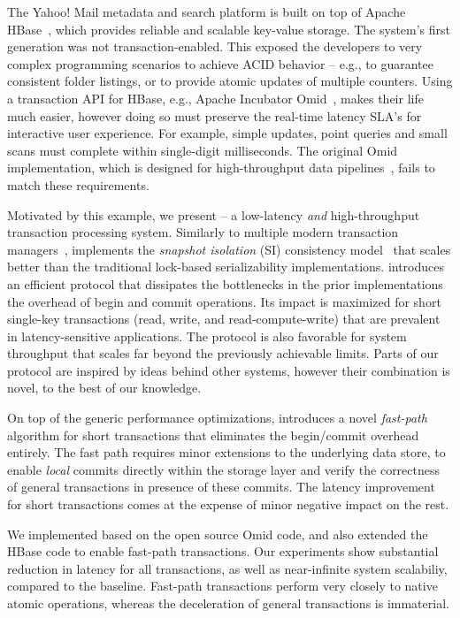 The Yahoo! Mail metadata and search platform is built on top of Apache HBase~\cite{hbase}, 
which provides reliable and scalable key-value storage. The system's first generation was not 
transaction-enabled. This exposed the developers to very complex programming scenarios 
to achieve ACID behavior -- e.g., to guarantee consistent folder listings, or to provide 
atomic updates of multiple counters. Using a transaction API for HBase, e.g.,  
Apache Incubator Omid~\cite{omid}, makes their life much easier, however doing so 
must preserve the real-time latency SLA's for interactive user experience. For example, 
simple updates, point queries and small scans must complete within single-digit milliseconds. 
The original Omid implementation, which is designed for high-throughput data pipelines~\cite{Omid2017}, 
fails to match these requirements. %

Motivated by this example, we present {\sys\/} -- a low-latency {\em and\/} high-throughput 
transaction processing system. Similarly to multiple modern transaction managers~\cite{cockroach,Spanner2012,Percolator2010,Omid2017},
{\sys\/} implements the {\em snapshot isolation} (SI) consistency model~\cite{DBLP:conf/sigmod/BerensonBGMOO95}
that scales better than the traditional lock-based serializability implementations. {\sys\/} introduces an efficient protocol 
that dissipates the bottlenecks in the prior implementations the overhead of begin and commit operations. 
Its impact is maximized for short single-key transactions (read, write, and read-compute-write) that are prevalent 
in latency-sensitive applications. The protocol is also favorable for system throughput that scales far beyond 
the previously achievable limits. Parts of our protocol are inspired by ideas behind other systems, however
their combination is novel, to the best of our knowledge. 

On top of the generic performance optimizations, {\sys\/} introduces a novel {\em fast-path\/} algorithm for short transactions 
that eliminates the begin/commit overhead entirely. The fast path requires minor extensions to the underlying 
data store, to enable {\em local\/} commits directly within the storage layer and verify the correctness of general 
transactions in presence of these commits. The latency improvement for short transactions comes at the expense 
of minor negative impact on the rest. 

We implemented {\sys\/} based on the open source Omid code, and also extended the HBase code to 
enable fast-path transactions. Our experiments show substantial reduction in latency for all transactions, 
as well as near-infinite system scalabiliy, compared to the baseline. Fast-path transactions perform very 
closely to native atomic operations, whereas the deceleration of general transactions is immaterial. 

